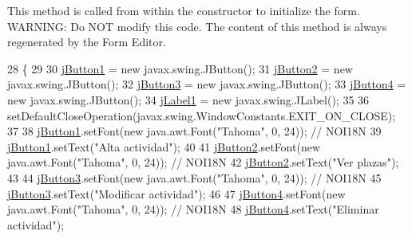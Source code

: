 This method is called from within the constructor to initialize the form. W\+A\+R\+N\+I\+NG\+: Do N\+OT modify this code. The content of this method is always regenerated by the Form Editor. 
\begin{DoxyCode}
28                                   \{
29 
30         \mbox{\hyperlink{classinterfacessoguar_1_1_c_u0104_a14ee464c46b5f60fbf5f0a5788fd04a8}{jButton1}} = \textcolor{keyword}{new} javax.swing.JButton();
31         \mbox{\hyperlink{classinterfacessoguar_1_1_c_u0104_a6cf10544c20d2e068ba50f9d6e620c6b}{jButton2}} = \textcolor{keyword}{new} javax.swing.JButton();
32         \mbox{\hyperlink{classinterfacessoguar_1_1_c_u0104_a54322417464e03c0282783a3b1655cfd}{jButton3}} = \textcolor{keyword}{new} javax.swing.JButton();
33         \mbox{\hyperlink{classinterfacessoguar_1_1_c_u0104_a6330c8387302eb22ad8266154cae3b6a}{jButton4}} = \textcolor{keyword}{new} javax.swing.JButton();
34         \mbox{\hyperlink{classinterfacessoguar_1_1_c_u0104_ad186ee919c545c2a04b7d0e7099a4e11}{jLabel1}} = \textcolor{keyword}{new} javax.swing.JLabel();
35 
36         setDefaultCloseOperation(javax.swing.WindowConstants.EXIT\_ON\_CLOSE);
37 
38         \mbox{\hyperlink{classinterfacessoguar_1_1_c_u0104_a14ee464c46b5f60fbf5f0a5788fd04a8}{jButton1}}.setFont(\textcolor{keyword}{new} java.awt.Font(\textcolor{stringliteral}{"Tahoma"}, 0, 24)); \textcolor{comment}{// NOI18N}
39         \mbox{\hyperlink{classinterfacessoguar_1_1_c_u0104_a14ee464c46b5f60fbf5f0a5788fd04a8}{jButton1}}.setText(\textcolor{stringliteral}{"Alta actividad"});
40 
41         \mbox{\hyperlink{classinterfacessoguar_1_1_c_u0104_a6cf10544c20d2e068ba50f9d6e620c6b}{jButton2}}.setFont(\textcolor{keyword}{new} java.awt.Font(\textcolor{stringliteral}{"Tahoma"}, 0, 24)); \textcolor{comment}{// NOI18N}
42         \mbox{\hyperlink{classinterfacessoguar_1_1_c_u0104_a6cf10544c20d2e068ba50f9d6e620c6b}{jButton2}}.setText(\textcolor{stringliteral}{"Ver plazas"});
43 
44         \mbox{\hyperlink{classinterfacessoguar_1_1_c_u0104_a54322417464e03c0282783a3b1655cfd}{jButton3}}.setFont(\textcolor{keyword}{new} java.awt.Font(\textcolor{stringliteral}{"Tahoma"}, 0, 24)); \textcolor{comment}{// NOI18N}
45         \mbox{\hyperlink{classinterfacessoguar_1_1_c_u0104_a54322417464e03c0282783a3b1655cfd}{jButton3}}.setText(\textcolor{stringliteral}{"Modificar actividad"});
46 
47         \mbox{\hyperlink{classinterfacessoguar_1_1_c_u0104_a6330c8387302eb22ad8266154cae3b6a}{jButton4}}.setFont(\textcolor{keyword}{new} java.awt.Font(\textcolor{stringliteral}{"Tahoma"}, 0, 24)); \textcolor{comment}{// NOI18N}
48         \mbox{\hyperlink{classinterfacessoguar_1_1_c_u0104_a6330c8387302eb22ad8266154cae3b6a}{jButton4}}.setText(\textcolor{stringliteral}{"Eliminar actividad"});

\end{DoxyCode}
